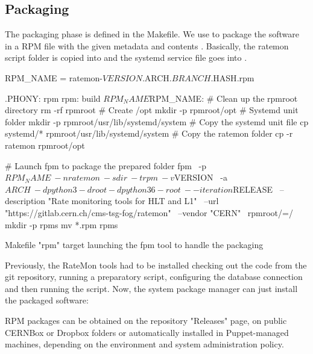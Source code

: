 \subsection{Packaging}

The packaging phase is defined in the Makefile. We use  \cite{fpm-packager} to package the software in a RPM file with the given metadata and contents \cite{Packaging1MergeRequestsCMSTSGFOGratemonGitLab-2020-10-07}. Basically, the ratemon script folder is copied into  \cite{FilesystemHierarchyStandard-2015-05-20} and the systemd service file goes into .

\begin{listing}[ht]
\begin{yamlcode}

RPM_NAME = ratemon-${VERSION}.${ARCH}.${BRANCH}.${HASH}.rpm

.PHONY: rpm
rpm: build ${RPM_NAME}
${RPM_NAME}:
  # Clean up the rpmroot directory
  rm -rf rpmroot
  # Create /opt
  mkdir -p rpmroot/opt
  # Systemd unit folder
  mkdir -p rpmroot/usr/lib/systemd/system
  # Copy the systemd unit file
  cp systemd/* rpmroot/usr/lib/systemd/system
  # Copy the ratemon folder
  cp -r ratemon rpmroot/opt

  # Launch fpm to package the prepared folder 
  fpm \
  -p ${RPM_NAME} \
  -n ratemon \
  -s dir \
  -t rpm \
  -v ${VERSION} \
  -a ${ARCH} \
  -d python3 -d root -d python36-root \
  --iteration ${RELEASE} \
  --description "Rate monitoring tools for HLT and L1" \
  --url "https://gitlab.cern.ch/cms-tsg-fog/ratemon" \
  --vendor "CERN" \
  rpmroot/=/
  mkdir -p rpms
  mv *.rpm rpms
\end{yamlcode}
\caption{Makefile "rpm" target launching the fpm tool to handle the packaging}
\end{listing}

Previously, the RateMon tools had to be installed checking out the code from the git repository, running a preparatory script, configuring the database connection and then running the script. Now, the system package manager can just install the packaged software:

\begin{textcode}
P5 $ yum install ratemon_0.1.rpm
\end{textcode}

RPM packages can be obtained on the repository "Releases" page, on public CERNBox or Dropbox folders or automatically installed in Puppet-managed machines, depending on the environment and system administration policy.

